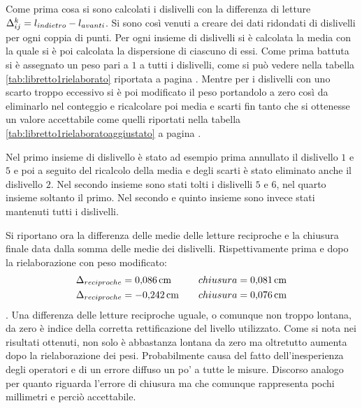 Come prima cosa si sono calcolati i dislivelli con la differenza di letture $\Delta_{ij}^{k}=\break l_{indietro}-l_{avanti}$. %
Si sono così venuti a creare dei dati ridondati di dislivelli per ogni coppia di punti.
Per ogni insieme di dislivelli si è calcolata la media con la quale si è poi calcolata la dispersione di ciascuno di essi.
Come prima battuta si è assegnato un peso pari a $1$ a tutti i dislivelli, come si può vedere nella tabella \ref{tab:libretto1rielaborato} riportata a pagina \pageref{tab:libretto1rielaborato}.
Mentre per i dislivelli con uno scarto troppo eccessivo si è poi modificato il peso portandolo a zero così da eliminarlo nel conteggio e ricalcolare poi media e scarti fin tanto che si ottenesse un valore accettabile come quelli riportati nella tabella \ref{tab:libretto1rielaboratoaggiustato} a pagina \pageref{tab:libretto1rielaboratoaggiustato}.

Nel primo insieme di dislivello è stato ad esempio prima annullato il dislivello $1$ e $5$ e poi a seguito del ricalcolo della media e degli scarti è stato eliminato anche il dislivello $2$.
Nel secondo insieme sono stati tolti i dislivelli $5$ e $6$, nel quarto insieme soltanto il primo. 
Nel secondo e quinto insieme sono invece stati mantenuti tutti i dislivelli.

Si riportano ora la differenza delle medie delle letture reciproche e la chiusura finale data dalla somma delle medie dei dislivelli. Rispettivamente prima e dopo la rielaborazione con peso modificato:
\begin{align*}
\Delta_{reciproche} &= \SI{0.086}{\centi\metre} \quad & chiusura = \SI{0.081}{\centi\metre} \\
\Delta_{reciproche} &= \SI{-0.242}{\centi\metre} \quad & chiusura = \SI{0.076}{\centi\metre}
\end{align*}.
Una differenza delle letture reciproche uguale, o comunque non troppo lontana, da zero è indice della corretta rettificazione del livello utilizzato. 
Come si nota nei risultati ottenuti, non solo è abbastanza lontana da zero ma oltretutto aumenta dopo la rielaborazione dei pesi. 
Probabilmente causa del fatto dell'inesperienza degli operatori e di un errore diffuso un po' a tutte le misure.
Discorso analogo per quanto riguarda l'errore di chiusura ma che comunque rappresenta pochi millimetri e perciò accettabile.
%
